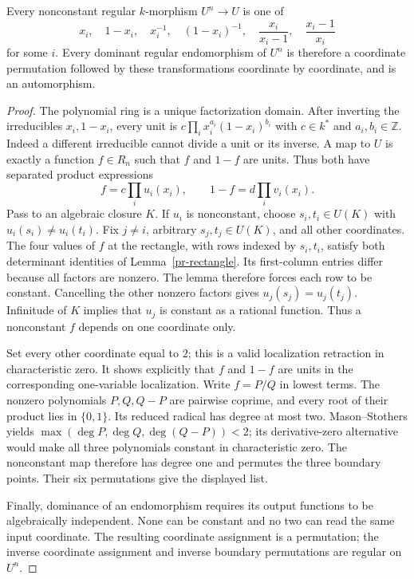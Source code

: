 \begin{theorem}
\label{pr-rigidity}
Every nonconstant regular $k$-morphism $U^n\to U$ is one of
\[
 x_i,\quad 1-x_i,\quad x_i^{-1},\quad (1-x_i)^{-1},\quad
 \frac{x_i}{x_i-1},\quad\frac{x_i-1}{x_i}
\]
for some $i$. Every dominant regular endomorphism of $U^n$ is therefore
a coordinate permutation followed by these transformations coordinate by
coordinate, and is an automorphism.
\end{theorem}
\begin{proof}
The polynomial ring is a unique factorization domain. After inverting the
irreducibles $x_i,1-x_i$, every unit is
$c\prod_i x_i^{a_i}(1-x_i)^{b_i}$ with $c\in k^*$ and $a_i,b_i\in\mathbb Z$.
Indeed a different irreducible cannot divide a unit or its inverse.
A map to $U$ is exactly a function $f\in R_n$ such that $f$ and $1-f$ are
units. Thus both have separated product expressions
\[
 f=c\prod_i u_i(x_i),\qquad 1-f=d\prod_i v_i(x_i).
\]
Pass to an algebraic closure $K$. If $u_i$ is nonconstant, choose
$s_i,t_i\in U(K)$ with $u_i(s_i)\ne u_i(t_i)$. Fix $j\ne i$, arbitrary
$s_j,t_j\in U(K)$, and all other coordinates. The four values of $f$
at the rectangle, with rows indexed by $s_i,t_i$, satisfy both determinant
identities of Lemma~\ref{pr-rectangle}. Its first-column
entries differ because all factors are nonzero. The lemma therefore forces
each row to be constant. Cancelling the other nonzero factors gives
$u_j(s_j)=u_j(t_j)$. Infinitude of $K$ implies that $u_j$ is constant as
a rational function. Thus a nonconstant $f$ depends on one coordinate only.

Set every other coordinate equal to $2$; this is a valid localization
retraction in characteristic zero. It shows explicitly that $f$ and $1-f$
are units in the corresponding one-variable localization. Write $f=P/Q$
in lowest terms. The nonzero polynomials $P,Q,Q-P$ are pairwise coprime,
and every root of their product lies in $\{0,1\}$. Its reduced radical has
degree at most two. Mason--Stothers yields
$\max(\deg P,\deg Q,\deg(Q-P))<2$; its derivative-zero alternative
would make all three polynomials constant in characteristic zero.
The nonconstant map therefore has degree one and permutes the three
boundary points. Their six permutations give the displayed list.

Finally, dominance of an endomorphism requires its output functions to be
algebraically independent. None can be constant and no two can read the
same input coordinate. The resulting coordinate assignment is a permutation;
the inverse coordinate assignment and inverse boundary permutations are
regular on $U^n$.
\end{proof}

